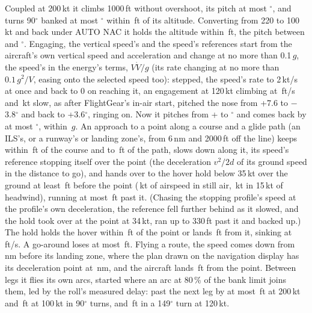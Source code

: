 \documentclass[10pt,a4paper,twocolumn]{article}
\begin{document}
Coupled at 200\,kt it climbs 1000\,ft without overshoot, its pitch at most \NApAltPitch$^\circ$, and turns 90$^\circ$ banked at most
\NApHdgBank$^\circ$ within \NApHdgDh\,ft of its altitude. Converting from 220 to 100\,kt and back under AUTO NAC it holds the altitude
within \NApConvDh\,ft, the pitch between \NApConvPitchLo{} and \NApConvPitchHi$^\circ$. Engaging, the vertical speed's and the speed's
references start from the aircraft's own vertical speed and acceleration and change at no more than 0.1\,$g$, the speed's in the energy's
terms, $V\dot V/g$ (its rate changing at no more than $0.1\,g^2/V$, easing onto the selected speed too): stepped, the speed's rate to
2\,kt/s at once and back to 0 on reaching it, an engagement at 120\,kt climbing at \NApEngClimb\,ft/s and \NApEngSlow\,kt slow, as after
FlightGear's in-air start, pitched the nose from +7.6 to $-$3.8$^\circ$ and back to +3.6$^\circ$, ringing on. Now it pitches from
+\NApEngPitch{} to \NApEngPitchLo$^\circ$ and comes back by at most \NApEngRev$^\circ$, within \NApEngG\,$g$. An approach to a point along a course and a glide
path (an ILS's, or a runway's or landing zone's, from 6\,nm and 2000\,ft off the line) keeps within \NApXte\,ft of the course and
\NApPathLo{} to \NApPathHi\,ft of the path, slows down along it, its speed's reference stopping itself over the point (the
deceleration $v^2/2d$ of its ground speed in the distance to go), and hands over to the hover hold below 35\,kt over the ground at least
\NApHandD\,ft before the point (\NApHandKt\,kt of airspeed in still air, \NApWindHand\,kt in 15\,kt of headwind), running at most
\NApPast\,ft past it. (Chasing the stopping profile's speed at the profile's own deceleration, the reference fell further behind as it
slowed, and the hold took over at the point at 34\,kt, ran up to 330\,ft past it and backed up.) The hold holds the hover within \NApHoldD\,ft of the point or
lands \NApDownD\,ft from it, sinking at \NApSink\,ft/s. A go-around loses at most \NApGaLost\,ft. Flying a route, the speed comes down
from \NApRouteDecel\,nm before its landing zone, where the plan drawn on the navigation display has its deceleration point at
\NApRoutePlan\,nm, and the aircraft lands \NApRouteDown\,ft from the point. Between legs it flies its own arcs, started where an arc at
80\,\% of the bank limit joins them, led by the roll's measured delay: past the next leg by at most \NApLnavFast\,ft at 200\,kt and
\NApLnavSlow\,ft at 100\,kt in 90$^\circ$ turns, and \NApLnavSharp\,ft in a 149$^\circ$ turn at 120\,kt.
\end{document}
